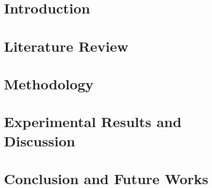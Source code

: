 \documentclass[12pt, a4paper]{report}
\begin{document}

\pagebreak



\pagebreak


\pagebreak



\pagebreak

\renewcommand{\contentsname}{Table of Contents}
\tableofcontents

\clearpage 
\setcounter{figure}{0}
\listoffigures

\clearpage 
{}
\listoftables
 

\clearpage




\chapter{Introduction} \label{ch: intro}
\setcounter{page}{0}


\chapter{Literature Review} \label{ch: reviews}


\chapter{Methodology}  \label{ch: methodology}


\chapter{Experimental Results and Discussion}  \label{ch: results}


\chapter{Conclusion and Future Works}  \label{ch: conclusion}


\clearpage
\renewcommand\bibname{References}
% 

\end{document}
